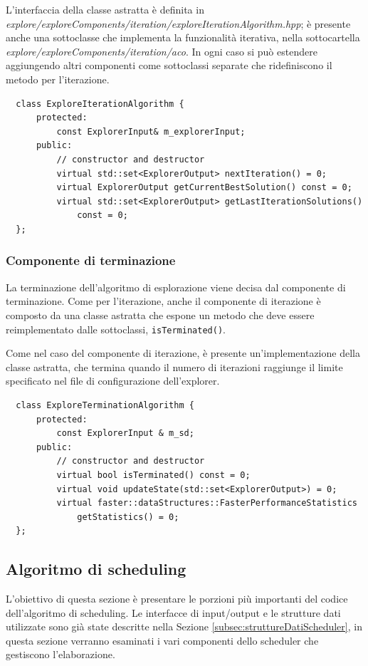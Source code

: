 L'interfaccia della classe astratta è definita in 
\emph{explore/exploreComponents/iteration/exploreIterationAlgorithm.hpp}; è 
presente anche una sottoclasse che implementa la funzionalità iterativa, nella 
sottocartella \emph{explore/exploreComponents/iteration/aco}. In ogni caso si 
può estendere aggiungendo altri componenti come sottoclassi separate che 
ridefiniscono il metodo per l'iterazione.
\newline
\begin{verbatim}
  class ExploreIterationAlgorithm {
      protected:
          const ExplorerInput& m_explorerInput;
      public:
          // constructor and destructor
          virtual std::set<ExplorerOutput> nextIteration() = 0;
          virtual ExplorerOutput getCurrentBestSolution() const = 0;
          virtual std::set<ExplorerOutput> getLastIterationSolutions()
              const = 0;
  };
\end{verbatim}


\subsubsection{Componente di terminazione}
La terminazione dell'algoritmo di esplorazione viene decisa dal componente di 
terminazione. Come per l'iterazione, anche il componente di iterazione è 
composto da una classe astratta che espone un metodo che deve essere 
reimplementato dalle sottoclassi, \verb+isTerminated()+.

Come nel caso del componente di iterazione, è presente un'implementazione della 
classe astratta, che termina quando il numero di iterazioni raggiunge il limite 
specificato nel file di configurazione dell'explorer.
\newline
\begin{verbatim}
  class ExploreTerminationAlgorithm {
      protected:
          const ExplorerInput & m_sd;
      public:
          // constructor and destructor
          virtual bool isTerminated() const = 0;
          virtual void updateState(std::set<ExplorerOutput>) = 0;
          virtual faster::dataStructures::FasterPerformanceStatistics 
              getStatistics() = 0;
  };
\end{verbatim}


\subsection{Algoritmo di scheduling}
\label{subsec:algoritmoScheduling}
L'obiettivo di questa sezione è presentare le porzioni più importanti del 
codice dell'algoritmo di scheduling. Le interfacce di input/output e le 
strutture dati utilizzate sono già state descritte nella Sezione 
\ref{subsec:struttureDatiScheduler}, in questa sezione verranno esaminati i 
vari componenti dello scheduler che gestiscono l'elaborazione.

